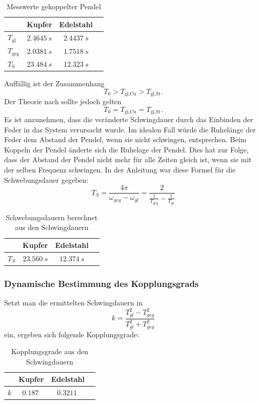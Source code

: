 \documentclass[
	a4paper,
	12pt,
	pagesize,
	ngerman
]{scrartcl}
\begin{document}
	\begin{table}[H]
	\centering
	\begin{tabular}{ l | c | c | c |}
		& Kupfer & Edelstahl  \\ \hline
		$T_\text{gl} $ &$\SI{2,4645}{s}$&$\SI{2,4437}{s}$\\  
		$T_\text{geg} $ &$\SI{2,0381}{s}$&$\SI{1,7518}{s}$\\  
		$T_\text{S} $ &$\SI{23,484}{s}$&$\SI{12,323}{s}$\\  \hline
	\end{tabular}
	\caption{Messwerte gekoppelter Pendel}
	\end{table}
	Auffällig ist der Zusammenhang
	\begin{equation}
		T_0 >  T_\text{gl,Cu} > T_\text{gl,St}.
	\end{equation}
	Der Theorie nach sollte jedoch gelten 
	\begin{equation}
		T_0 =  T_\text{gl,Cu} = T_\text{gl,St}.
	\end{equation}
	Es ist anzunehmen, dass die veränderte Schwingdauer durch das Einbinden der Feder in das System verursacht wurde. Im idealen Fall würde die Ruhelänge der Feder dem Abstand der Pendel, wenn sie nicht schwingen, entsprechen. Beim Koppeln der Pendel änderte sich die Ruhelage der Pendel. Dies hat zur Folge, dass der Abstand der Pendel nicht mehr für alle Zeiten gleich ist, wenn sie mit der selben Frequenz schwingen.
	\newline
	\noindent{}In der Anleitung war diese Formel für die Schwebungsdauer gegeben:
	\begin{equation}
		T_S = \frac{4\pi}{\omega_{geg}-\omega_{gl}} = \frac{2}{\frac{1}{T_{geg}} - \frac{1}{T_{gl}}}
	\end{equation}
	\begin{table}[H]
	\centering
	\begin{tabular}{ l | c | c | c |}
		& Kupfer & Edelstahl  \\ \hline
		$T_S$ &$\SI{23,560}{s}$&$\SI{12,374}{s}$\\  \hline
	\end{tabular}
	\caption{Schwebungsdauern berechnet aus den Schwingdauern}
	\end{table}

	\subsubsection{Dynamische Bestimmung des Kopplungsgrads}
	Setzt man die ermittelten Schwingdauern in
	\begin{equation}
		k = \frac{T_{gl}^2-T_{geg}^2}{T_{gl}^2+T_{geg}^2}
	\end{equation}
	ein, ergeben sich folgende Kopplungsgrade:
	\begin{table}[H]
	\centering
	\begin{tabular}{ l | c | c | c |}
		& Kupfer & Edelstahl  \\ \hline
		$k$ &$\SI{0,187}{}$&$\SI{0,3211}{}$\\  \hline
	\end{tabular}
	\caption{Kopplungsgrade aus den Schwingdauern}
	\end{table}
\end{document}
